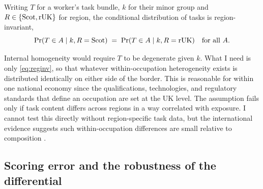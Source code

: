 \begin{assumption}\label{as:reginv}
Writing $T$ for a worker's task bundle, $k$ for their minor group and $R \in \{\mathrm{Scot}, \mathrm{rUK}\}$ for region, the conditional distribution of tasks is region-invariant,
\begin{equation}\label{eq:reginv}
\Pr(T \in A \mid k, R = \mathrm{Scot}) \;=\; \Pr(T \in A \mid k, R = \mathrm{rUK})
\quad \text{for all } A .
\end{equation}
\end{assumption}

\noindent
Internal homogeneity would require $T$ to be degenerate given $k$. What I need is only \cref{eq:reginv}, so that whatever within-occupation heterogeneity exists is distributed identically on either side of the border. 
This is reasonable for within one national economy since the qualifications, technologies, and regulatory standards that define an occupation are set at the UK level.
The assumption fails only if task content differs across regions in a way correlated with exposure. I cannot test this directly without region-specific task data, but the international evidence suggests such within-occupation differences are small relative to composition \citep{handel2012, autor2013}. 


\subsection{Scoring error and the robustness of the differential}\label{sec:noise}

